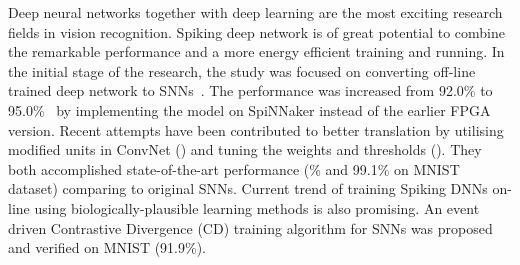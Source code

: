 Deep neural networks together with deep learning are the most exciting research fields in vision recognition.
Spiking deep network is of great potential to combine the remarkable performance and a more energy efficient training and running.
In the initial stage of the research, the study was focused on converting off-line trained deep network to SNNs~\cite{o2013real}.
The performance was increased from 92.0\% to 95.0\%~\cite{unpublished_EVAN} by implementing the model on SpiNNaker instead of the earlier FPGA version.
Recent attempts have been contributed to better translation by utilising modified units in ConvNet (\cite{cao2015spiking}) and tuning the weights and thresholds (\cite{unpublished_peter}).
They both accomplished state-of-the-art performance (\% and 99.1\% on MNIST dataset) comparing to original SNNs.
Current trend of training Spiking DNNs on-line using biologically-plausible learning methods is also promising.
An event driven Contrastive Divergence (CD) training algorithm for SNNs was proposed and verified on MNIST (91.9\%).


